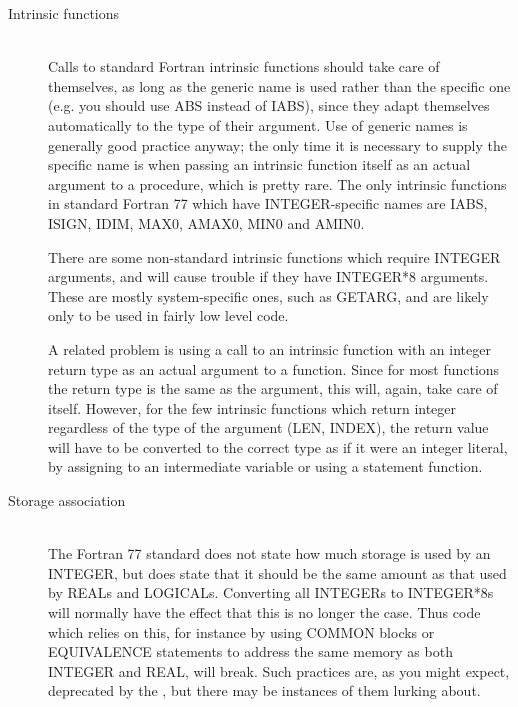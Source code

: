 \documentclass[twoside,11pt,nolof]{starlink}
\providecommand{\ditem}[1]{\item[#1]\mbox{}\\}
\begin{document}
\begin{description}
%
\ditem{Intrinsic functions}
Calls to standard Fortran intrinsic functions should take care of themselves,
as long as the generic name is used rather than the specific one
(e.g. you should use ABS instead of IABS),
since they adapt themselves automatically to the type of their argument.
Use of generic names is generally good practice anyway;
the only time it is necessary to supply the specific name is
when passing an intrinsic function itself as an actual argument
to a procedure, which is pretty rare.
The only intrinsic functions in standard Fortran 77 which have
INTEGER-specific names are IABS, ISIGN, IDIM, MAX0, AMAX0, MIN0 and AMIN0.

There are some non-standard intrinsic functions which require INTEGER
arguments, and will cause trouble if they have INTEGER*8 arguments.
These are mostly system-specific ones, such as GETARG,
and are likely only to be used in fairly low level code.

A related problem is using a call to an intrinsic function with
an integer return type as an actual argument to a function.
Since for most functions the return type is the same as the argument,
this will, again, take care of itself.  However, for the few
intrinsic functions which return integer regardless of the type of
the argument (LEN, INDEX), the return value will have to be converted to
the correct type as if it were an integer literal,
by assigning to an intermediate variable or using a statement function.
%
\ditem{Storage association}
The Fortran 77 standard does not state how much storage is used by
an INTEGER, but does state that it should be the same amount as that
used by REALs and LOGICALs.
Converting all INTEGERs to INTEGER*8s will
normally have the effect that this is no longer the case.
Thus code which relies on this, for instance by using COMMON blocks or
EQUIVALENCE statements to address the same memory as both INTEGER and REAL,
will break.
Such practices are, as you might expect, deprecated by the
,
but there may be instances of them lurking about.


\end{description}
\end{document}
